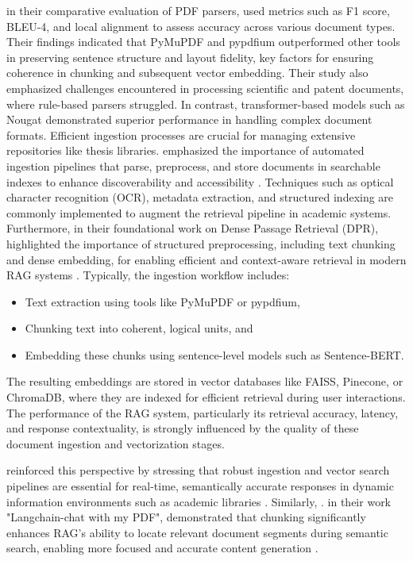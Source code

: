 \begin{refsection}
\hspace{0.4cm}\citeauthor{adhikari2024comparative} \citeyear{adhikari2024comparative} in their comparative evaluation of PDF parsers, used metrics such as F1 score, BLEU-4, and local alignment to assess accuracy across various document types. Their findings indicated that PyMuPDF and pypdfium outperformed other tools in preserving sentence structure and layout fidelity, key factors for ensuring coherence in chunking and subsequent vector embedding. Their study also emphasized challenges encountered in processing scientific and patent documents, where rule-based parsers struggled. In contrast, transformer-based models such as Nougat demonstrated superior performance in handling complex document formats. Efficient ingestion processes are crucial for managing extensive repositories like thesis libraries. \citeauthor{zhang2023automated} \citeyear{zhang2023automated} emphasized the importance of automated ingestion pipelines that parse, preprocess, and store documents in searchable indexes to enhance discoverability and accessibility \cite{zhang2023automated}. Techniques such as optical character recognition (OCR), metadata extraction, and structured indexing are commonly implemented to augment the retrieval pipeline in academic systems. 
Furthermore, \citeauthor{karpukhin2020dense} \citeyear{karpukhin2020dense} in their foundational work on Dense Passage Retrieval (DPR), highlighted the importance of structured preprocessing, including text chunking and dense embedding, for enabling efficient and context-aware retrieval in modern RAG systems \cite{karpukhin2020dense}. Typically, the ingestion workflow includes:
\begin{itemize}
    \item Text extraction using tools like PyMuPDF or pypdfium,
    \item Chunking text into coherent, logical units, and
    \item Embedding these chunks using sentence-level models such as Sentence-BERT.
\end{itemize}

The resulting embeddings are stored in vector databases like FAISS, Pinecone, or ChromaDB, where they are indexed for efficient retrieval during user interactions. The performance of the RAG system, particularly its retrieval accuracy, latency, and response contextuality, is strongly influenced by the quality of these document ingestion and vectorization stages.

\hspace{0.4cm}\citeauthor{sagi2024genai} \citeyear{sagi2024genai} reinforced this perspective by stressing that robust ingestion and vector search pipelines are essential for real-time, semantically accurate responses in dynamic information environments such as academic libraries \cite{karpukhin2020dense}. Similarly,  \citeauthor{deepak2025langchain}  \citeyear{deepak2025langchain}. in their work "Langchain-chat with my PDF", demonstrated that chunking significantly enhances RAG’s ability to locate relevant document segments during semantic search, enabling more focused and accurate content generation \cite{deepak2025langchain}.


\end{refsection}

